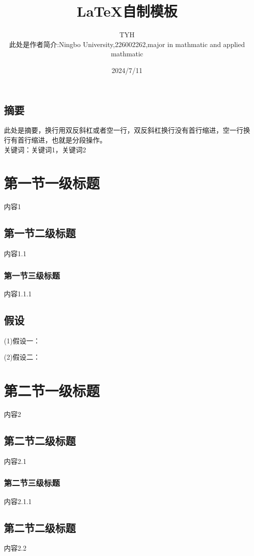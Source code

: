 \documentclass[a4paper,AutoFakeBold={2.7}]{ctexart} %
\title{\heiti \zihao{-2}\LaTeX 自制模板}%
\author{\kaishu \zihao{-4}TYH\\ \songti \zihao{-5} 此处是作者简介:Ningbo University,226002262,major in mathmatic and applied mathmatic}%
\date{2024/7/11}%
\begin{document}
\maketitle%
\vspace{-10pt}%
\newpage
\begin{center}
	\tableofcontents%
\end{center}
\newpage
\begin{center}
	\section*{摘要}
\end{center}

此处是摘要，换行用双反斜杠或者空一行，双反斜杠换行没有首行缩进，空一行换行有首行缩进，也就是分段操作。\\
\heiti 关键词：\songti 关键词1，关键词2
\newpage
\section{第一节一级标题}%
\songti {} 内容1%
\subsection{第一节二级标题} \label{第一节二级标题}
内容1.1
\subsubsection{第一节三级标题}
内容1.1.1
\subsection{假设}
(1)假设一：

(2)假设二：
\section{第二节一级标题}
内容2
\subsection{第二节二级标题}
内容2.1
\subsubsection{第二节三级标题}
内容2.1.1
\subsection{第二节二级标题}
内容2.2
\end{document}
